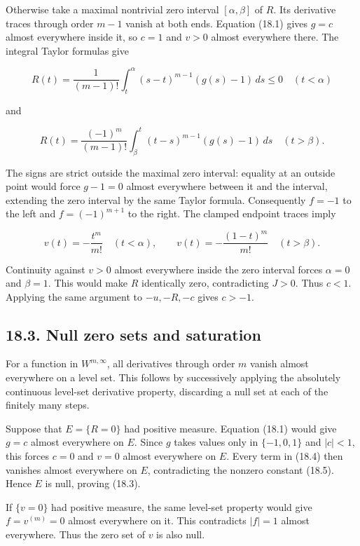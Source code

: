 \documentclass[11pt]{article}
\begin{document}
Otherwise take a maximal nontrivial zero interval \([\alpha,\beta]\) of
\(R\). Its derivative traces through order \(m-1\) vanish at both ends.
Equation (18.1) gives \(g=c\) almost everywhere inside it, so \(c=1\)
and \(v>0\) almost everywhere there. The integral Taylor formulas give

\[
R(t)=\frac1{(m-1)!}\int_t^\alpha(s-t)^{m-1}(g(s)-1)\,ds\le0
\quad(t<\alpha)
\]

and

\[
R(t)=\frac{(-1)^m}{(m-1)!}\int_\beta^t(t-s)^{m-1}(g(s)-1)\,ds
\quad(t>\beta).
\]

The signs are strict outside the maximal zero interval: equality at an
outside point would force \(g-1=0\) almost everywhere between it and the
interval, extending the zero interval by the same Taylor formula.
Consequently \(f=-1\) to the left and \(f=(-1)^{m+1}\) to the right. The
clamped endpoint traces imply

\[
v(t)=-\frac{t^m}{m!}\quad(t<\alpha),\qquad
v(t)=-\frac{(1-t)^m}{m!}\quad(t>\beta).
\tag{18.6}
\]

Continuity against \(v>0\) almost everywhere inside the zero interval
forces \(\alpha=0\) and \(\beta=1\). This would make \(R\) identically
zero, contradicting \(J>0\). Thus \(c<1\). Applying the same argument to
\(-u,-R,-c\) gives \(c>-1\).

\subsection{18.3. Null zero sets and
saturation}\label{null-zero-sets-and-saturation}

For a function in \(W^{m,\infty}\), all derivatives through order \(m\)
vanish almost everywhere on a level set. This follows by successively
applying the absolutely continuous level-set derivative property,
discarding a null set at each of the finitely many steps.

Suppose that \(E=\{R=0\}\) had positive measure. Equation (18.1) would
give \(g=c\) almost everywhere on \(E\). Since \(g\) takes values only
in \(\{-1,0,1\}\) and \(|c|<1\), this forces \(c=0\) and \(v=0\) almost
everywhere on \(E\). Every term in (18.4) then vanishes almost
everywhere on \(E\), contradicting the nonzero constant (18.5). Hence
\(E\) is null, proving (18.3).

If \(\{v=0\}\) had positive measure, the same level-set property would
give \(f=v^{(m)}=0\) almost everywhere on it. This contradicts \(|f|=1\)
almost everywhere. Thus the zero set of \(v\) is also null.
\end{document}
